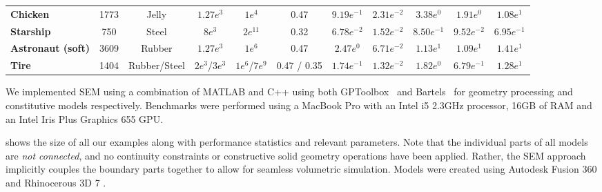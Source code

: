 \begin{table}[h]
\begin{center}
\begin{tabular}{l c c c c c c c c c c}
   \textbf{Chicken}                 & 1773 & Jelly & $1.27 e^3$ & $1 e^4$ & 0.47 & $9.19 e^{-1}$ & $2.31 e^{-2}$ & $3.38 e^{0}$ & $1.91 e^{0}$ & $1.08 e^{1}$ \\
   \textbf{Starship}                & 750 & Steel & $8 e^3$ & $2 e^{11}$ & 0.32 & $6.78 e^{-2}$ & $1.52 e^{-2}$ & $8.50 e^{-1}$ & $9.52 e^{-2}$ & $6.95 e^{-1}$ \\
   \textbf{Astronaut (soft)}       & 3609 & Rubber &  $1.27 e^3$  & $1 e^6$  & 0.47 & $2.47 e^{0}$ & $6.71 e^{-2}$ & $1.13 e^{1}$ & $1.09 e^{1}$ & $1.41 e^{1}$ \\
   \textbf{Tire}                    & 1404 & Rubber/Steel & $2 e^3$/$3 e^3$ & $1 e^6$/$7 e^9$ & 0.47 / 0.35 & $1.74 e^{-1}$ & $1.32 e^{-2}$ & $1.82 e^{0}$ & $6.79 e^{-1}$ & $1.28 e^{1}$ \\
   \hline
  \end{tabular}
  \end{center}
  
  \end{table}




We implemented SEM using a combination of MATLAB and C++ using both GPToolbox~\cite{gptoolbox} and Bartels~\cite{bartels} for geometry processing and constitutive models 
respectively. Benchmarks were performed using a MacBook Pro with an Intel i5 2.3GHz processor, 16GB of RAM and an Intel Iris Plus Graphics 655 GPU.

 shows the size of all our examples along with performance statistics and relevant parameters.
Note that the individual parts of all models are \emph{not connected}, and no continuity constraints or constructive solid geometry operations have been applied. 
Rather, the SEM approach implicitly couples the boundary parts together to allow for seamless volumetric simulation. 
Models were created using Autodesk Fusion 360 \cite{AutodeskFusion360} and Rhinocerous 3D 7 \cite{mcneel-rhinoceros}.
  
